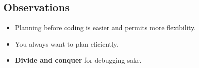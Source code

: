 \subsection{Observations}
\begin{itemize}
    \item Planning before coding is easier and permits more flexibility.
    \item You always want to plan eficiently.
    \item \textbf{Divide and conquer} for debugging sake.
\end{itemize}
